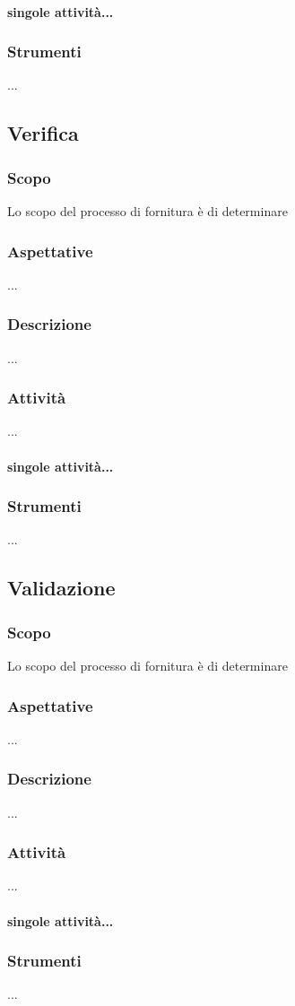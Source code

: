     \paragraph{singole attività...}
    \subsubsection{Strumenti}
    ...

\subsection{Verifica}
\label{verifica}
    \subsubsection{Scopo}
    Lo scopo del processo di fornitura è di determinare
    \subsubsection{Aspettative}
    ...
    \subsubsection{Descrizione}
    ...
    \subsubsection{Attività}
    ...
    \paragraph{singole attività...}
    \subsubsection{Strumenti}
    ...

\subsection{Validazione}
    \subsubsection{Scopo}
    Lo scopo del processo di fornitura è di determinare
    \subsubsection{Aspettative}
    ...
    \subsubsection{Descrizione}
    ...
    \subsubsection{Attività}
    ...
    \paragraph{singole attività...}
    \subsubsection{Strumenti}
    ...